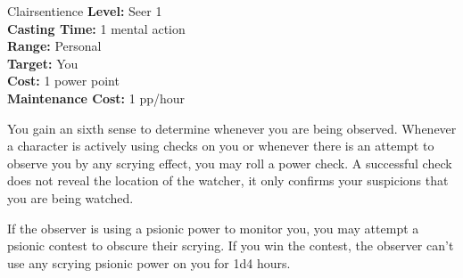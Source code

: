 {Clairsentience}
{
	\textbf{Level:}
	Seer 1\\
	\textbf{Casting Time:}
	1 mental action\\
	\textbf{Range:}
	Personal\\
	\textbf{Target:}
	You\\
	\textbf{Cost:}
	1 power point\\
	\textbf{Maintenance Cost:}
	1 pp/hour\\
}
{
	You gain an sixth sense to determine whenever you are being observed. Whenever a character is actively using  checks on you or whenever there is an attempt to observe you by any scrying effect, you may roll a power check. A successful check does not reveal the location of the watcher, it only confirms your suspicions that you are being watched.

	If the observer is using a psionic power to monitor you, you may attempt a psionic contest to obscure their scrying. If you win the contest, the observer can't use any scrying psionic power on you for 1d4 hours.
}